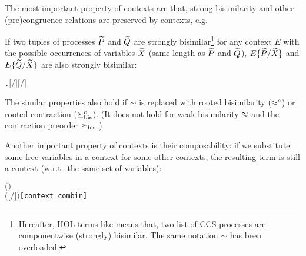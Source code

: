 The most important property of contexts are that, strong bisimilarity
and other (pre)congruence relations are preserved by contexts, e.g.
\begin{lemma}
If two tuples of processes $\widetilde P$ and $\widetilde Q$ are strongly
bisimilar\footnote{Hereafter, HOL terms like 
  means that, two list of CCS processes are componentwise
  (strongly) bisimilar. The same notation $\sim$ has been overloaded.}
for any context $E$ with the possible occurrences of variables $\widetilde
X$ (same length as $\widetilde P$ and $\widetilde Q$), $E\{\widetilde P/\widetilde X\}$ and
$E\{\widetilde Q/\widetilde X\}$ are also strongly bisimilar:
\begin{alltt}
\HOLTokenTurnstile{}   \HOLSymConst{\HOLTokenConj{}}   \HOLSymConst{\ensuremath{=}}   \HOLSymConst{\HOLTokenConj{}}  \HOLSymConst{\HOLTokenStrongEQ}  \HOLSymConst{\HOLTokenImp{}}
   \HOLSymConst{\HOLTokenForall{}}.    \HOLSymConst{\HOLTokenImp{}} \ensuremath{[}\ensuremath{/}\ensuremath{]}  \HOLSymConst{\HOLTokenStrongEQ} \ensuremath{[}\ensuremath{/}\ensuremath{]} 
\end{alltt}
\end{lemma}
The similar properties also hold if $\sim$ is replaced with rooted
bisimilarity ($\mathrel{\approx^{\rm{c}}}$) or rooted contraction ($\mathrel{\succeq^{\rm{c}}_{\rm{bis}}}$). (It does
not hold for weak bisimilarity $\approx$ and the contraction preorder $\mathrel{\succeq_{\rm{bis}}}$.)

Another important property of contexts is their composability: if we
substitute some free variables in a context for some other contexts, the
resulting term is still a context (w.r.t.~the same set of variables):
\begin{alltt}
\HOLTokenTurnstile{}   \HOLSymConst{\HOLTokenConj{}}    \HOLSymConst{\HOLTokenConj{}}  \ensuremath{(} \ensuremath{)}  \HOLSymConst{\HOLTokenConj{}}
     \HOLSymConst{\ensuremath{=}}   \HOLSymConst{\HOLTokenImp{}}
     \ensuremath{(}\ensuremath{[}\ensuremath{/}\ensuremath{]} \ensuremath{)}\hfill{[context_combin]}
\end{alltt}

